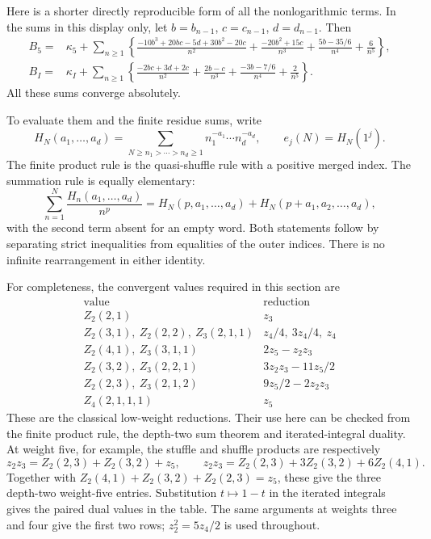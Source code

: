 \documentclass[11pt,a4paper]{article}
\numberwithin{equation}{section}
\theoremstyle{definition}
\begin{document}
Here is a shorter directly reproducible form of all the nonlogarithmic
terms.  In the sums in this display only, let
$b=b_{n-1}$, $c=c_{n-1}$, $d=d_{n-1}$.  Then
\begin{align}
 B_5={}&\kappa_5+\sum_{n\geq1}\left\{
 \frac{-10b^3+20bc-5d+30b^2-20c}{n^2}
 +\frac{-20b^2+15c}{n^3}
 +\frac{5b-35/6}{n^4}+\frac6{n^5}\right\},
 \label{q5:B5sum}\\
 B_I={}&\kappa_I+\sum_{n\geq1}\left\{
 \frac{-2bc+3d+2c}{n^2}+\frac{2b-c}{n^3}
 +\frac{-3b-7/6}{n^4}+\frac2{n^5}\right\}.
 \label{q5:BIsum}
\end{align}
All these sums converge absolutely.

To evaluate them and the finite residue sums, write
\[
 H_N(a_1,\ldots,a_d)=
    \sum_{N\geq n_1>\cdots>n_d\geq1}
                 n_1^{-a_1}\cdots n_d^{-a_d},
 \qquad e_j(N)=H_N(1^j).
\]
The finite product rule is the quasi-shuffle rule with a positive merged
index.  The summation rule is equally elementary:
\begin{equation}\label{q5:finite-prefix}
 \sum_{n=1}^N\frac{H_n(a_1,\ldots,a_d)}{n^p}
   =H_N(p,a_1,\ldots,a_d)
      +H_N(p+a_1,a_2,\ldots,a_d),
\end{equation}
with the second term absent for an empty word.  Both statements follow
by separating strict inequalities from equalities of the outer indices.
There is no infinite rearrangement in either identity.

For completeness, the convergent values required in this section are
\begin{equation}\label{q5:MZVtable}
\begin{array}{c|c}
\text{value}&\text{reduction}\\\hline
Z_2(2,1)&z_3\\
Z_2(3,1),\ Z_2(2,2),\ Z_3(2,1,1)&z_4/4,\ 3z_4/4,\ z_4\\
Z_2(4,1),\ Z_3(3,1,1)&2z_5-z_2z_3\\
Z_2(3,2),\ Z_3(2,2,1)&3z_2z_3-11z_5/2\\
Z_2(2,3),\ Z_3(2,1,2)&9z_5/2-2z_2z_3\\
Z_4(2,1,1,1)&z_5
\end{array}
\end{equation}
These are the classical low-weight reductions.  Their use here can be
checked from the finite product rule, the depth-two sum theorem and
iterated-integral duality.  At weight five, for example, the stuffle
and shuffle products are respectively
\[
 z_2z_3=Z_2(2,3)+Z_2(3,2)+z_5,
 \qquad
 z_2z_3=Z_2(2,3)+3Z_2(3,2)+6Z_2(4,1).
\]
Together with
$Z_2(4,1)+Z_2(3,2)+Z_2(2,3)=z_5$, these give the three
depth-two weight-five entries.  Substitution $t\mapsto1-t$ in the
iterated integrals gives the paired dual values in the table.
The same arguments at weights three and four give the first two rows;
$z_2^2=5z_4/2$ is used throughout.
\end{document}
